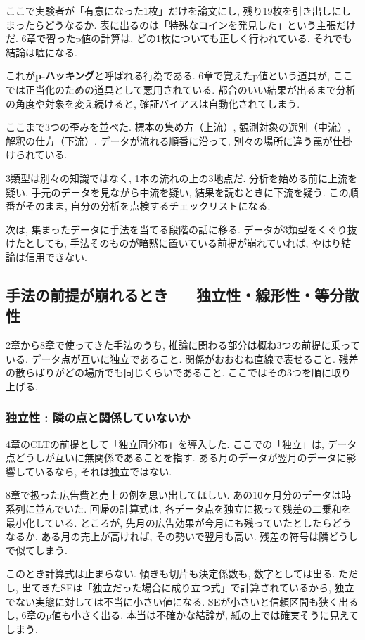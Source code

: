 ここで実験者が「有意になった1枚」だけを論文にし, 残り19枚を引き出しにしまったらどうなるか.
表に出るのは「特殊なコインを発見した」という主張だけだ.
6章で習ったp値の計算は, どの1枚についても正しく行われている.
それでも結論は嘘になる.

これが\textbf{p-ハッキング}と呼ばれる行為である.
6章で覚えたp値という道具が, ここでは正当化のための道具として悪用されている.
都合のいい結果が出るまで分析の角度や対象を変え続けると, 確証バイアスは自動化されてしまう.

ここまで3つの歪みを並べた.
標本の集め方（上流）, 観測対象の選別（中流）, 解釈の仕方（下流）.
データが流れる順番に沿って, 別々の場所に違う罠が仕掛けられている.

3類型は別々の知識ではなく, 1本の流れの上の3地点だ.
分析を始める前に上流を疑い, 手元のデータを見ながら中流を疑い, 結果を読むときに下流を疑う.
この順番がそのまま, 自分の分析を点検するチェックリストになる.

次は, 集まったデータに手法を当てる段階の話に移る.
データが3類型をくぐり抜けたとしても, 手法そのものが暗黙に置いている前提が崩れていれば, やはり結論は信用できない.


\subsection{手法の前提が崩れるとき — 独立性・線形性・等分散性}

2章から8章で使ってきた手法のうち, 推論に関わる部分は概ね3つの前提に乗っている.
データ点が互いに独立であること. 関係がおおむね直線で表せること. 残差の散らばりがどの場所でも同じくらいであること.
ここではその3つを順に取り上げる.

\subsubsection*{独立性 : 隣の点と関係していないか}

4章のCLTの前提として「独立同分布」を導入した.
ここでの「独立」は, データ点どうしが互いに無関係であることを指す.
ある月のデータが翌月のデータに影響しているなら, それは独立ではない.

8章で扱った広告費と売上の例を思い出してほしい.
あの10ヶ月分のデータは時系列に並んでいた.
回帰の計算式は, 各データ点を独立に扱って残差の二乗和を最小化している.
ところが, 先月の広告効果が今月にも残っていたとしたらどうなるか.
ある月の売上が高ければ, その勢いで翌月も高い. 残差の符号は隣どうしで似てしまう.

このとき計算式は止まらない. 傾きも切片も決定係数も, 数字としては出る.
ただし, 出てきたSEは「独立だった場合に成り立つ式」で計算されているから, 独立でない実態に対しては不当に小さい値になる.
SEが小さいと信頼区間も狭く出るし, 6章のp値も小さく出る.
本当は不確かな結論が, 紙の上では確実そうに見えてしまう.

